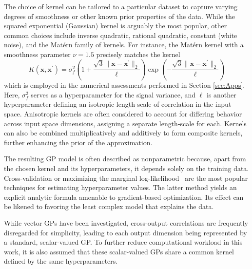 \documentclass[preprint,10pt]{elsarticle}
\begin{document}
The choice of kernel can be tailored to a particular dataset to capture varying degrees of smoothness or other known prior properties of the data. While the squared exponential 
(Gaussian) kernel is arguably the most popular, other common choices include inverse quadratic, rational quadratic, constant (white noise), and the Mat\'ern family of kernels. 
For instance, the Mat\'ern kernel with a smoothness parameter $\nu = 1.5$ precisely matches the kernel
\begin{equation*}
	K\left(\mathbf{x},\mathbf{x}^\prime\right) = \sigma_f^2\left(1 + \frac{\sqrt{3}\|\mathbf{x}-\mathbf{x}^\prime\|_2}{\ell}\right)
\exp\left(-\frac{\sqrt{3}\|\mathbf{x}-\mathbf{x}^\prime\|_2}{\ell}\right)
\label{eq:matern32}
\end{equation*}
which is employed in the numerical assessments performed in Section \ref{sec:Apps}.
Here, $\sigma_f^2$ serves as a hyperparameter for the signal variance, and $\ell$ is another hyperparameter defining an isotropic 
length-scale of correlation in the input space. Anisotropic kernels are often considered to account 
for differing behavior across input space dimensions, assigning a separate length-scale for each. Kernels can also be combined multiplicatively and additively to form composite 
kernels, further enhancing the prior of the approximation.

The resulting GP model is often described as nonparametric because, apart from the chosen kernel and its hyperparameters, it depends solely on the training data. Cross-validation or 
maximizing the marginal log-likelihood~\cite{rasmussen2003gaussian} are the most popular techniques for estimating hyperparameter values. The latter method yields an explicit 
analytic formula amenable to gradient-based optimization. Its effect can be likened to favoring the least complex model that explains the data.

While vector GPs have been investigated, cross-output correlations are frequently disregarded for simplicity, leading to each output dimension being represented by a 
standard, scalar-valued GP. To further reduce computational workload in this work, it is also assumed that these scalar-valued GPs share a common kernel 
defined by the same hyperparameters.
\end{document}
